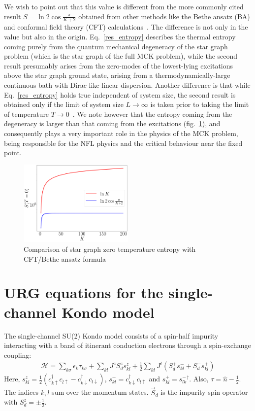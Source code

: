 \documentclass[12pt]{revtex4-2}
\begin{document}
We wish to point out that this value is different from the more commonly cited result \(S = \ln 2\cos \frac{\pi}{K+2}\) obtained from other methods like the Bethe ansatz (BA) and conformal field theory (CFT) calculations~\cite{Gan_Andrei_Coleman_1993,andrei_destri_1984,Tsvelick_weigmann_mchannel_1985,sacramento1989,emery_kivelson,affleck_1991_overscreen}. The difference is not only in the value but also in the origin. Eq.~\ref{res_entropy} describes the thermal entropy coming purely from the quantum mechanical degeneracy of the star graph problem (which is the star graph of the full MCK problem), while the second result presumably arises from the zero-modes of the lowest-lying excitations above the star graph ground state, arising from a thermodynamically-large continuous bath with Dirac-like linear dispersion. Another difference is that while Eq.~\ref{res_entropy} holds true independent of system size, the second result is obtained only if the limit of system size \(L \to \infty\) is taken prior to taking the limit of temperature \(T \to 0\)~\cite{Gan_Andrei_Coleman_1993,rozhkov_1998,vondelft_prl_1998}. We note however that the entropy coming from the degeneracy is larger than that coming from the excitations (fig.~\ref{entropy_comparison}), and consequently plays a very important role in the physics of the MCK problem, being responsible for the NFL physics and the critical behaviour near the fixed point.
\begin{figure}[!htpb]
	\centering
	\includegraphics[width=0.5\textwidth]{../numerics/entropy_comparison.pdf}
	\caption{Comparison of star graph zero temperature entropy with CFT/Bethe ansatz formula}
	\label{entropy_comparison}
\end{figure}

\appendix
\section{URG equations for the single-channel Kondo model}
The single-channel SU(2) Kondo model consists of a spin-half impurity interacting with a band of itinerant conduction electrons through a spin-exchange coupling:
\begin{align}
\label{1KondoURG}
	\mathcal{H} = \sum_{k\sigma}\epsilon_{k}\tau_{k\sigma} + \sum_{kl} J^z S_d^z s^z_{kl} + \frac{1}{2}\sum_{kl} J^t \left(S_d^+ s^-_{kl}  + S_d^- s^+_{kl}\right)
\end{align}
Here, \(s^z_{kl} = \frac{1}{2}\left(c^\dagger_{k\uparrow}c_{l \uparrow} - c^\dagger_{k\downarrow}c_{l \downarrow}\right)\), \(s^-_{kl} = c^\dagger_{k \downarrow}c_{l \uparrow}\) and \(s^+_{kl} = {s^-_{lk}}^\dagger\). Also, \(\tau = \hat n - \frac{1}{2}\). The indices \(k,l\) sum over the momentum states. \(\vec S_d\) is the impurity spin operator with \(S_d^z = \pm \frac{1}{2}\).
\end{document}
